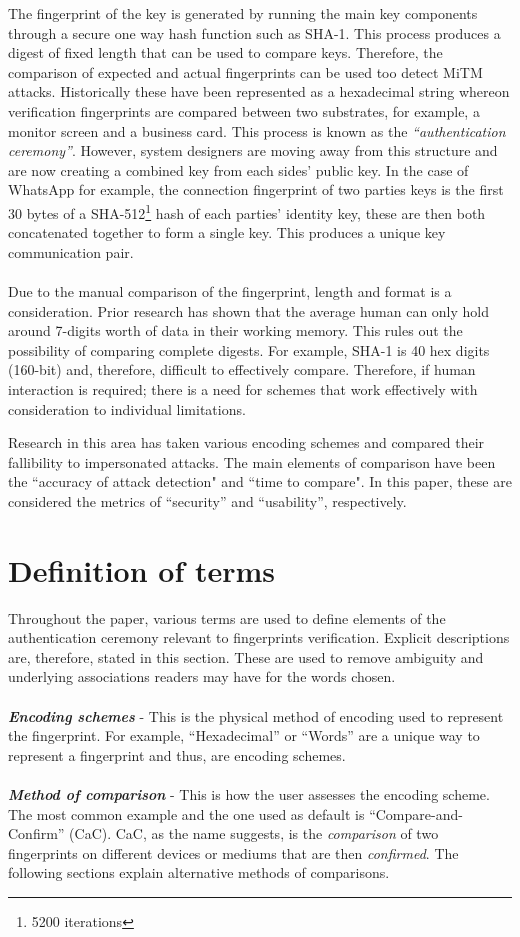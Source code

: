 The fingerprint of the key is generated by running the main key components through a secure one way hash function such as SHA-1. This process produces a digest of fixed length that can be used to compare keys. Therefore, the comparison of expected and actual fingerprints can be used too detect MiTM attacks.
Historically these have been represented as a hexadecimal string whereon verification fingerprints are compared between two substrates, for example, a monitor screen and a business card.
This process is known as the \textit{``authentication ceremony''}. However, system designers are moving away from this structure and are now creating a combined key from each sides' public key. In the case of WhatsApp for example, the connection fingerprint of two parties keys is the first 30 bytes of a SHA-512\footnote{5200 iterations} hash of each parties' identity key, these are then both concatenated together to form a single key\cite{whatsapp2017paper}. This produces a unique key communication pair.
\\\\
Due to the manual comparison of the fingerprint, length and format is a consideration. Prior research has shown that the average human can only hold around 7-digits worth of data in their working memory\cite{miller1956magical}. This rules out the possibility of comparing complete digests. For example, SHA-1 is 40 hex digits (160-bit) and, therefore, difficult to effectively compare. Therefore, if human interaction is required; there is a need for schemes that work effectively with consideration to individual limitations.

Research in this area has taken various encoding schemes and compared their fallibility to impersonated attacks. The main elements of comparison have been the ``accuracy of attack detection" and ``time to compare". In this paper, these are considered the metrics of ``security'' and ``usability'', respectively.

\section{Definition of terms}
Throughout the paper, various terms are used to define elements of the authentication ceremony relevant to fingerprints verification. Explicit descriptions are, therefore, stated in this section. These are used to remove ambiguity and underlying associations readers may have for the words chosen.
\\\\
\textbf{\textit{Encoding schemes}} - This is the physical method of encoding used to represent the fingerprint. For example, ``Hexadecimal'' or ``Words'' are a unique way to represent a fingerprint and thus, are encoding schemes.
\\\\
\textbf{\textit{Method of comparison}} - This is how the user assesses the encoding scheme. The most common example and the one used as default is ``Compare-and-Confirm'' (CaC). CaC, as the name suggests, is the \textit{comparison} of two fingerprints on different devices or mediums that are then \textit{confirmed}. The following sections explain alternative methods of comparisons.


